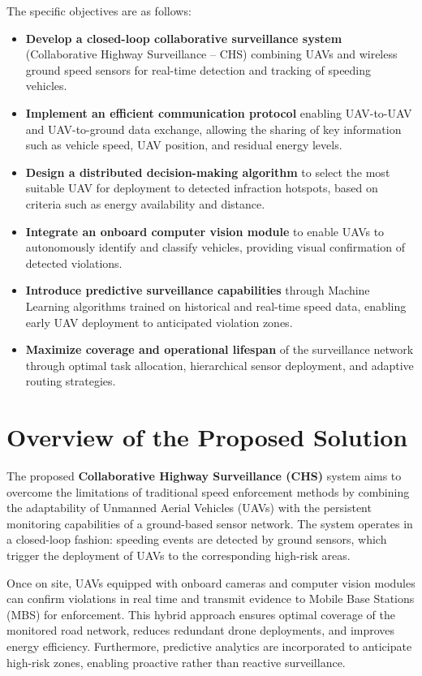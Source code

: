 The specific objectives are as follows:
\begin{itemize}
    \item \textbf{Develop a closed-loop collaborative surveillance system} (Collaborative Highway Surveillance – CHS) combining UAVs and wireless ground speed sensors for real-time detection and tracking of speeding vehicles.
    \item \textbf{Implement an efficient communication protocol} enabling UAV-to-UAV and UAV-to-ground data exchange, allowing the sharing of key information such as vehicle speed, UAV position, and residual energy levels.
    \item \textbf{Design a distributed decision-making algorithm} to select the most suitable UAV for deployment to detected infraction hotspots, based on criteria such as energy availability and distance.
    \item \textbf{Integrate an onboard computer vision module} to enable UAVs to autonomously identify and classify vehicles, providing visual confirmation of detected violations.
    \item \textbf{Introduce predictive surveillance capabilities} through Machine Learning algorithms trained on historical and real-time speed data, enabling early UAV deployment to anticipated violation zones.
    \item \textbf{Maximize coverage and operational lifespan} of the surveillance network through optimal task allocation, hierarchical sensor deployment, and adaptive routing strategies.
\end{itemize}




\section{Overview of the Proposed Solution}

The proposed \textbf{Collaborative Highway Surveillance (CHS)} system aims to overcome the limitations of traditional speed enforcement methods by combining the adaptability of Unmanned Aerial Vehicles (UAVs) with the persistent monitoring capabilities of a ground-based sensor network. The system operates in a closed-loop fashion: speeding events are detected by ground sensors, which trigger the deployment of UAVs to the corresponding high-risk areas. 

Once on site, UAVs equipped with onboard cameras and computer vision modules can confirm violations in real time and transmit evidence to Mobile Base Stations (MBS) for enforcement. This hybrid approach ensures optimal coverage of the monitored road network, reduces redundant drone deployments, and improves energy efficiency. Furthermore, predictive analytics are incorporated to anticipate high-risk zones, enabling proactive rather than reactive surveillance. 

